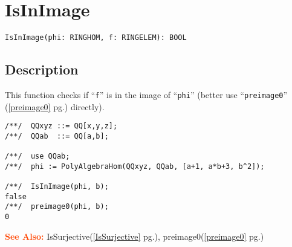 \documentclass[a4paper]{mybook}
\newenvironment{command}{}{} %
\newcommand\SeeAlso{\par\textcolor{OrangeRed}{\textbf{\large See Also: }}}
\begin{document}
\section{IsInImage}
\label{IsInImage}
\begin{command} %


\begin{Verbatim}[label=syntax, rulecolor=\color{MidnightBlue},
frame=single]
IsInImage(phi: RINGHOM, f: RINGELEM): BOOL
\end{Verbatim}


\subsection*{Description}

This function checks if ``\verb&f&'' is in the image of ``\verb&phi&''
(better use ``\verb&preimage0&'' (\ref{preimage0} pg.\pageref{preimage0}) directly).
\begin{Verbatim}[label=example, rulecolor=\color{PineGreen}, frame=single]
/**/  QQxyz ::= QQ[x,y,z];
/**/  QQab  ::= QQ[a,b];

/**/  use QQab;
/**/  phi := PolyAlgebraHom(QQxyz, QQab, [a+1, a*b+3, b^2]);

/**/  IsInImage(phi, b);
false
/**/  preimage0(phi, b);
0
\end{Verbatim}


\SeeAlso %
  IsSurjective(\ref{IsSurjective} pg.\pageref{IsSurjective}), 
    preimage0(\ref{preimage0} pg.\pageref{preimage0})
\end{command} %
\end{document}
